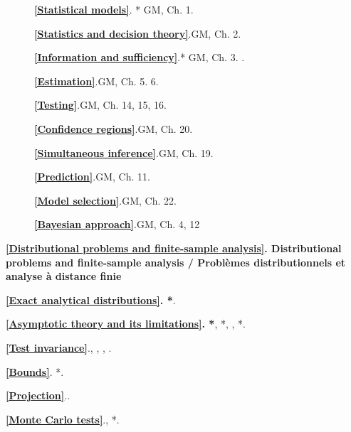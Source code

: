 \documentclass[titlepage,11pt,amstex]{article}
\begin{document}
\begin{description}
\item[\quad ] \textbf{\ref{Statistical models}}. * GM, Ch. 1.

\item[\quad ] \textbf{\ref{Statistics and decision theory}}.\quad * GM, Ch.
2.

\item[\quad ] \textbf{\ref{Information and sufficiency}}.* GM, Ch. 3. \cite%
{Basu(1977)}.

\item[\quad ] \textbf{\ref{Estimation}}.\quad GM, Ch. 5. 6.

\item[\quad ] \textbf{\ref{Testing}}.\quad * GM, Ch. 14, 15, 16.

\item[\quad ] \textbf{\ref{Confidence regions}}.\quad * GM, Ch. 20.

\item[\quad ] \textbf{\ref{Simultaneous inference}}.\quad * GM, Ch. 19.

\item[\quad ] \textbf{\ref{Prediction}}.\quad GM, Ch. 11.

\item[\quad ] \textbf{\ref{Model selection}}.\quad GM, Ch. 22.

\item[\quad ] \textbf{\ref{Bayesian approach}}.\quad GM, Ch. 4, 12
\end{description}

\quad

\noindent \textbf{\ref{Distributional problems and finite-sample analysis}.
Distributional problems and finite-sample analysis / Probl\`{e}mes
distributionnels et analyse \`{a} distance finie}

\quad

\begin{description}
\item[\quad ] \textbf{\ref{Exact analytical distributions}. *}\cite[Chapters
1 and 2]{Ullah(2004)}.

\item \textbf{\ref{Asymptotic theory and its limitations}. *}\cite%
{Dufour(2000)}, *\cite{Dufour(2001)}, \cite{Dufour(2003)}, *\cite%
{Bahadur-Savage(1956)}.

\item \textbf{\ref{Test invariance}}.\quad *\cite{Dufour-Dagenais(1991)}, 
\cite{Dufour-Dagenais(1992)}, \cite{Dufour-Dagenais(1992b)}, \cite%
{Dufour-Dagenais(1994)}.

\item[\quad ] \textbf{\ref{Bounds}}. *\cite{Dufour(1990)}.

\item[\quad ] \textbf{\ref{Projection}}.\quad *\cite%
{Abdelkhalek-Dufour(1998)}.

\item[\quad ] \textbf{\ref{Monte Carlo tests}}.\quad *\cite%
{Dufour-Khalaf(2001)}, *\cite{Dufour(2006)}.
\end{description}
\end{document}
